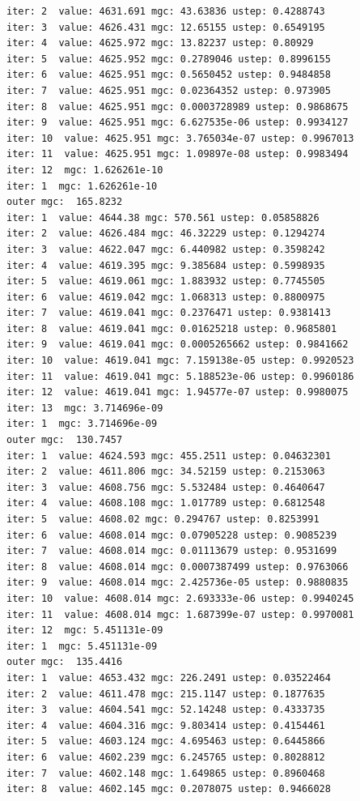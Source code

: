 \documentclass[
  letterpaper,
  DIV=11,
  numbers=noendperiod]{scrartcl}
\begin{document}
\begin{verbatim}
iter: 2  value: 4631.691 mgc: 43.63836 ustep: 0.4288743 
iter: 3  value: 4626.431 mgc: 12.65155 ustep: 0.6549195 
iter: 4  value: 4625.972 mgc: 13.82237 ustep: 0.80929 
iter: 5  value: 4625.952 mgc: 0.2789046 ustep: 0.8996155 
iter: 6  value: 4625.951 mgc: 0.5650452 ustep: 0.9484858 
iter: 7  value: 4625.951 mgc: 0.02364352 ustep: 0.973905 
iter: 8  value: 4625.951 mgc: 0.0003728989 ustep: 0.9868675 
iter: 9  value: 4625.951 mgc: 6.627535e-06 ustep: 0.9934127 
iter: 10  value: 4625.951 mgc: 3.765034e-07 ustep: 0.9967013 
iter: 11  value: 4625.951 mgc: 1.09897e-08 ustep: 0.9983494 
iter: 12  mgc: 1.626261e-10 
iter: 1  mgc: 1.626261e-10 
outer mgc:  165.8232 
iter: 1  value: 4644.38 mgc: 570.561 ustep: 0.05858826 
iter: 2  value: 4626.484 mgc: 46.32229 ustep: 0.1294274 
iter: 3  value: 4622.047 mgc: 6.440982 ustep: 0.3598242 
iter: 4  value: 4619.395 mgc: 9.385684 ustep: 0.5998935 
iter: 5  value: 4619.061 mgc: 1.883932 ustep: 0.7745505 
iter: 6  value: 4619.042 mgc: 1.068313 ustep: 0.8800975 
iter: 7  value: 4619.041 mgc: 0.2376471 ustep: 0.9381413 
iter: 8  value: 4619.041 mgc: 0.01625218 ustep: 0.9685801 
iter: 9  value: 4619.041 mgc: 0.0005265662 ustep: 0.9841662 
iter: 10  value: 4619.041 mgc: 7.159138e-05 ustep: 0.9920523 
iter: 11  value: 4619.041 mgc: 5.188523e-06 ustep: 0.9960186 
iter: 12  value: 4619.041 mgc: 1.94577e-07 ustep: 0.9980075 
iter: 13  mgc: 3.714696e-09 
iter: 1  mgc: 3.714696e-09 
outer mgc:  130.7457 
iter: 1  value: 4624.593 mgc: 455.2511 ustep: 0.04632301 
iter: 2  value: 4611.806 mgc: 34.52159 ustep: 0.2153063 
iter: 3  value: 4608.756 mgc: 5.532484 ustep: 0.4640647 
iter: 4  value: 4608.108 mgc: 1.017789 ustep: 0.6812548 
iter: 5  value: 4608.02 mgc: 0.294767 ustep: 0.8253991 
iter: 6  value: 4608.014 mgc: 0.07905228 ustep: 0.9085239 
iter: 7  value: 4608.014 mgc: 0.01113679 ustep: 0.9531699 
iter: 8  value: 4608.014 mgc: 0.0007387499 ustep: 0.9763066 
iter: 9  value: 4608.014 mgc: 2.425736e-05 ustep: 0.9880835 
iter: 10  value: 4608.014 mgc: 2.693333e-06 ustep: 0.9940245 
iter: 11  value: 4608.014 mgc: 1.687399e-07 ustep: 0.9970081 
iter: 12  mgc: 5.451131e-09 
iter: 1  mgc: 5.451131e-09 
outer mgc:  135.4416 
iter: 1  value: 4653.432 mgc: 226.2491 ustep: 0.03522464 
iter: 2  value: 4611.478 mgc: 215.1147 ustep: 0.1877635 
iter: 3  value: 4604.541 mgc: 52.14248 ustep: 0.4333735 
iter: 4  value: 4604.316 mgc: 9.803414 ustep: 0.4154461 
iter: 5  value: 4603.124 mgc: 4.695463 ustep: 0.6445866 
iter: 6  value: 4602.239 mgc: 6.245765 ustep: 0.8028812 
iter: 7  value: 4602.148 mgc: 1.649865 ustep: 0.8960468 
iter: 8  value: 4602.145 mgc: 0.2078075 ustep: 0.9466028 

\end{verbatim}
\end{document}
